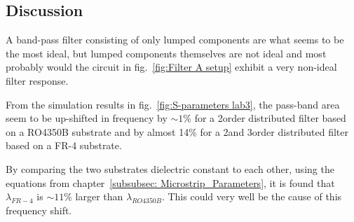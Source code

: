 \documentclass[report.tex]{subfiles}
\begin{document}
\subsection{Discussion}

A band-pass filter consisting of only lumped components are what seems to be the most ideal, but lumped components themselves are not ideal and most probably would the circuit in fig.~\ref{fig:Filter A setup} exhibit a very non-ideal filter response.

From the simulation results in fig.~\ref{fig:S-parameters lab3}, the pass-band area seem to be up-shifted in frequency by $\sim 1\%$ for a 2\nd order distributed filter based on a RO4350B substrate and by almost 14\% for a 2\nd and 3\rd order distributed filter based on a FR-4 substrate.

By comparing the two substrates dielectric constant to each other, using the equations from chapter~\ref{subsubsec: Microstrip_Parameters}, it is found that $\lambda_{FR-4}$ is $\sim 11\%$ larger than $\lambda_{RO4350B}$. This could very well be the cause of this frequency shift.
\end{document}
